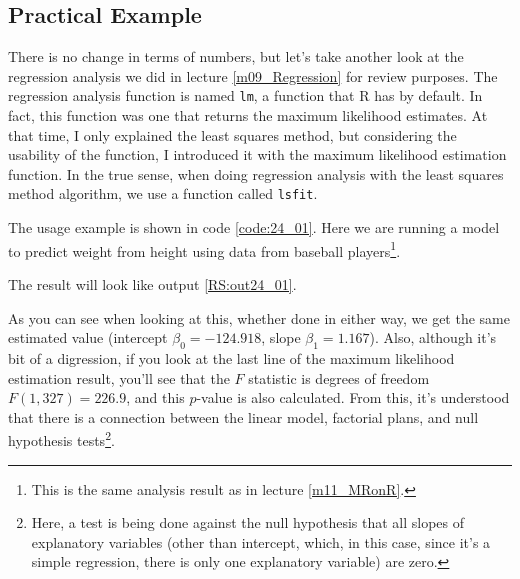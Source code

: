 \documentclass{ltjbook}
\begin{document}
\subsection{Practical Example}
There is no change in terms of numbers, but let's take another look at the regression analysis we did in lecture \ref{m09_Regression} for review purposes.
The regression analysis function is named \verb|lm|, a function that R has by default. In fact, this function was one that returns the maximum likelihood estimates.
At that time, I only explained the least squares method, but considering the usability of the function, I introduced it with the maximum likelihood estimation function.
In the true sense, when doing regression analysis with the least squares method algorithm, we use a function called \verb|lsfit|.

The usage example is shown in code \ref{code:24_01}. Here we are running a model to predict weight from height using data from baseball players\footnote{This is the same analysis result as in lecture \ref{m11_MRonR}.}.

The result will look like output \ref{RS:out24_01}.


As you can see when looking at this, whether done in either way, we get the same estimated value (intercept $\beta_0=-124.918$, slope $\beta_1=1.167$). Also, although it's bit of a digression, if you look at the last line of the maximum likelihood estimation result, you'll see that the $F$ statistic is degrees of freedom $F(1,327)=226.9$, and this $p$-value is also calculated. From this, it's understood that there is a connection between the linear model, factorial plans, and null hypothesis tests\footnote{Here, a test is being done against the null hypothesis that all slopes of explanatory variables (other than intercept, which, in this case, since it's a simple regression, there is only one explanatory variable) are zero.}.
\end{document}
